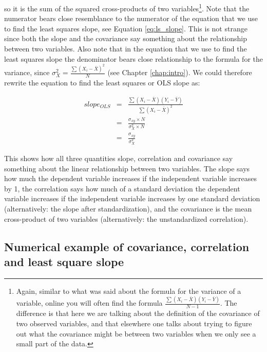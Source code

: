 \documentclass[]{book}\usepackage[]{graphicx}\usepackage[]{color}
\begin{document}
so it is the sum of the squared cross-products of two variables\footnote{Again, similar to what was said about the formula for the variance of a variable, online you will often find the formula $\frac{\sum(X_i - \bar{X})(Y_i - \bar{Y})}{N-1}$. The difference is that here we are talking about the definition of the covariance of two observed variables, and that elsewhere one talks about trying to figure out what the covariance might be between two variables when we only see a small part of the data.}. Note that the numerator bears close resemblance to the numerator of the equation that we use to find the least squares slope, see Equation \ref{eq:ls_slope}. This is not strange since both the slope and the covariance say something about the relationship between two variables. Also note that in the equation that we use to find the least squares slope the denominator bears close relationship to the formula for the variance, since $\sigma_X^2 = \frac{\sum(X_i - \bar{X} )^2 }{N}$ (see Chapter \ref{chap:intro}). We could therefore rewrite the equation to find the least squares or OLS slope as:


\begin{eqnarray}
slope_{OLS} &=& \frac{\sum(X_i - \bar{X})(Y_i - \bar{Y})}{\sum(X_i - \bar{X})^2} \\
 &=&     \frac{\sigma_{xy}\times N }{\sigma_X^2\times N } \nonumber\\
 &=&    \frac{\sigma_{xy} }{\sigma_X^2 } \nonumber
\end{eqnarray}

This shows how all three quantities slope, correlation and covariance say something about the linear relationship between two variables. The slope says how much the dependent variable increases if the independent variable increases by 1, the correlation says how much of a standard deviation the dependent variable increases if the independent variable increases by one standard deviation (alternatively: the slope after standardization), and the covariance is the mean cross-product of two variables (alternatively: the unstandardized correlation). 


\subsection{Numerical example of covariance, correlation and least square slope}
\end{document}
